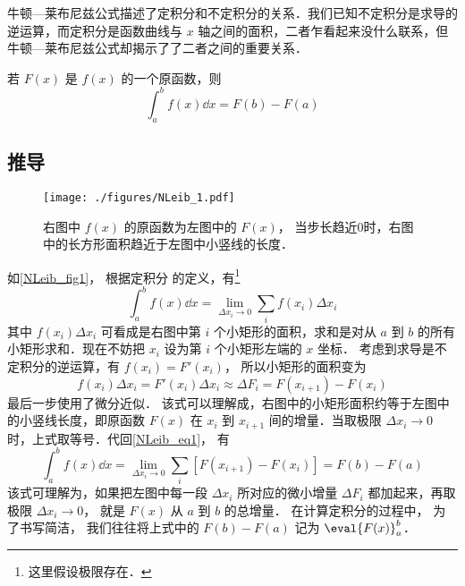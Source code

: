 

牛顿—莱布尼兹公式描述了定积分和不定积分的关系．我们已知不定积分是求导的逆运算，而定积分是函数曲线与 $x$ 轴之间的面积，二者乍看起来没什么联系，但牛顿—莱布尼兹公式却揭示了了二者之间的重要关系．

若 $F(x)$ 是 $f(x)$ 的一个原函数，则
\begin{equation}\label{NLeib_eq1}
\int_a^b f(x) \dd{x}  = F(b) - F(a)
\end{equation}

\subsection{推导}
\begin{figure}[ht]
\centering
\texttt{[image: ./figures/NLeib\_1.pdf]}
\caption{右图中 $f(x)$ 的原函数为左图中的 $F(x)$， 当步长趋近0时，右图中的长方形面积趋近于左图中小竖线的长度．}\label{NLeib_fig1}
\end{figure}

如\autoref{NLeib_fig1}， 根据定积分 的定义，有\footnote{这里假设极限存在．}
\begin{equation}
\int_a^b f(x) \dd{x}= \lim_{\Delta x_i\to 0}\sum_i f(x_i)\Delta x_i
\end{equation}
其中 $f(x_i)\Delta x_i$ 可看成是右图中第 $i$ 个小矩形的面积，求和是对从 $a$ 到 $b$ 的所有小矩形求和．现在不妨把 $x_i$ 设为第 $i$ 个小矩形左端的 $x$ 坐标． 考虑到求导是不定积分的逆运算，有 $f(x_i)=F'(x_i)$， 所以小矩形的面积变为
\begin{equation}
f(x_i)\Delta x_i = F'(x_i)\Delta x_i \approx \Delta F_i = F(x_{i+1})-F(x_i)
\end{equation}
最后一步使用了微分近似． %
该式可以理解成，右图中的小矩形面积约等于左图中的小竖线长度，即原函数 $F(x)$ 在 $x_i$ 到 $x_{i+1}$ 间的增量．当取极限 $\Delta x_i \to 0$ 时，上式取等号．代回\autoref{NLeib_eq1}， 有
\begin{equation}
\int_a^b f(x) \dd{x}= \lim_{\Delta x_i\to 0}\sum_i [F(x_{i+1})-F(x_i)] = F(b)-F(a)
\end{equation}
该式可理解为，如果把左图中每一段 $\Delta x_i$ 所对应的微小增量 $\Delta F_i$ 都加起来，再取极限 $\Delta x_i \to 0$， 就是 $F(x)$ 从 $a$ 到 $b$ 的总增量． 在计算定积分的过程中， 为了书写简洁， 我们往往将上式中的 $F(b) - F(a)$ 记为 $\eval{F(x)}_a^b$．

